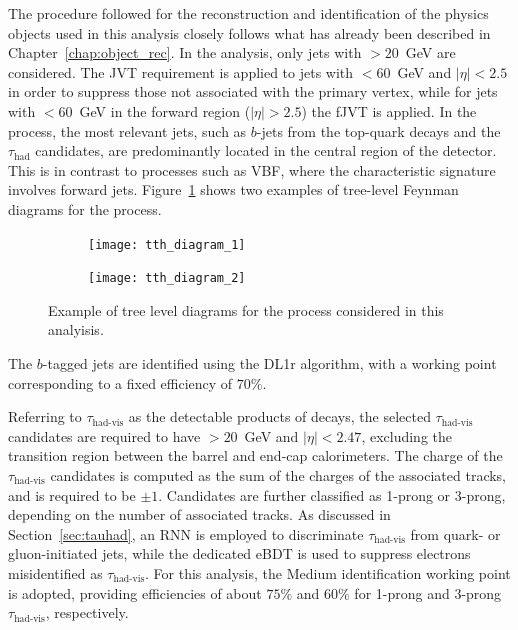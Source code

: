 The procedure followed for the reconstruction and identification of the physics objects used in this analysis closely follows what has already been described in Chapter~\ref{chap:object_rec}.  
In the \ttHtt analysis, only jets with \pt$>20$~GeV are considered. The JVT requirement is applied to jets with \pt$ < 60$~GeV and $|\eta| < 2.5$ in order to suppress those not associated with the primary vertex, while for jets with \pt$ < 60$~GeV in the forward region ($|\eta| > 2.5$) the fJVT is applied. In the \ttHtt process, the most relevant jets, such as $b$-jets from the top-quark decays and the $\tau_{\text{had}}$ candidates, are predominantly located in the central region of the detector. This is in contrast to processes such as VBF, where the characteristic signature involves forward jets. Figure~\ref{fig:tth_topo} shows two examples of tree-level Feynman diagrams for the \ttHtt process.
\begin{figure}[htbp]
    \centering
    \begin{subfigure}[b]{0.48\textwidth}
        \texttt{[image: tth\_diagram\_1]}
    \end{subfigure}
    \hfill
    \begin{subfigure}[b]{0.48\textwidth}
        \texttt{[image: tth\_diagram\_2]}
    \end{subfigure}
    \hfill
    \caption{Example of tree level diagrams for the \ttHtt process considered in this analyisis.}
    \label{fig:tth_topo}
\end{figure}
\FloatBarrier
The $b$-tagged jets are identified using the DL1r algorithm, with a working point corresponding to a fixed efficiency of $70\%$.  

Referring to $\tau_{\text{had-vis}}$ as the detectable products of \tauhad decays, the selected $\tau_{\text{had-vis}}$ candidates are required to have \pt$ > 20$~GeV and $|\eta| < 2.47$, excluding the transition region between the barrel and end-cap calorimeters. The charge of the $\tau_{\text{had-vis}}$ candidates is computed as the sum of the charges of the associated tracks, and is required to be $\pm 1$. Candidates are further classified as 1-prong or 3-prong, depending on the number of associated tracks. As discussed in Section~\ref{sec:tauhad}, an RNN is employed to discriminate $\tau_{\text{had-vis}}$ from quark- or gluon-initiated jets, while the dedicated eBDT is used to suppress electrons misidentified as $\tau_{\text{had-vis}}$. For this analysis, the Medium identification working point is adopted, providing efficiencies of about $75\%$ and $60\%$ for 1-prong and 3-prong $\tau_{\text{had-vis}}$, respectively.  


